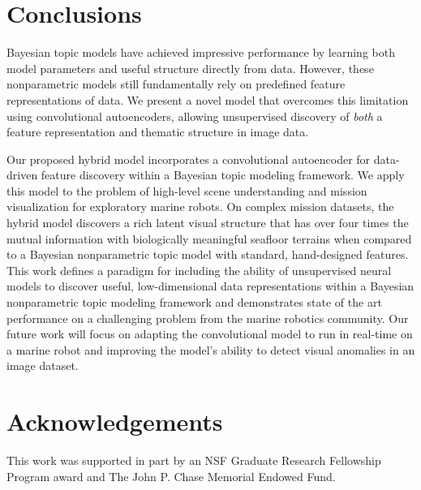 \documentclass[letterpaper, 10 pt, conference]{ieeeconf}
\begin{document}
    
\section{Conclusions}
Bayesian topic models have achieved impressive performance by learning both model parameters and useful structure directly from data. However, these nonparametric models still fundamentally rely on predefined feature representations of data. We present a novel model that overcomes this limitation using convolutional autoencoders, allowing unsupervised discovery of \textit{both} a feature representation and thematic structure in image data. 

Our proposed hybrid model incorporates a convolutional autoencoder for data-driven feature discovery within a Bayesian topic modeling framework.  We apply this model to the problem of high-level scene understanding and mission visualization for exploratory marine robots. On complex mission datasets, the hybrid model discovers a rich latent visual structure that has over four times the mutual information with biologically meaningful seafloor terrains when compared to a Bayesian nonparametric topic model with standard, hand-designed features. This work defines a paradigm for including the ability of unsupervised neural models to discover useful, low-dimensional data representations within a Bayesian nonparametric topic modeling framework and demonstrates state of the art performance on a challenging problem from the marine robotics community.  Our future work will focus on adapting the convolutional model to run in real-time on a marine robot and improving the model's ability to detect visual anomalies in an image dataset.

\section*{Acknowledgements}
This work was supported in part by an NSF Graduate Research Fellowship Program award and The John P. Chase Memorial Endowed Fund.



\end{document}
